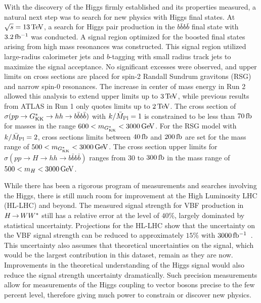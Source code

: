 With the discovery of the Higgs firmly established and its properties measured, a natural next step was to search for new physics with Higgs final states. At $\sqrt{s} = 13 \TeV$, a search for Higgs pair production in the $b\bar{b}b\bar{b}$ final state with $3.2\mbox{\,fb$^{-1}$}$ was conducted. A signal region optimized for the boosted final states arising from high mass resonances was constructed. This signal region utilized large-radius calorimeter jets and $b$-tagging with small radius track jets to maximize the signal acceptance. No significant excesses were observed, and upper limits on cross sections are placed for spin-2 Randall Sundrum gravitons (RSG) and narrow spin-0 resonances. The increase in center of mass energy in Run 2 allowed this analysis to extend upper limits up to $3 \TeV$, while previous results from ATLAS in Run 1 only quotes limits up to $2 \TeV$. The cross section of $\sigma(pp \to G^*_{\rm KK} \to hh \to b\bar{b}b\bar{b})$ with $k/\bar{M}_{\rm Pl}=1$ is constrained to be less than $70 \mbox{\,fb}$ for masses in the range $600 < m_{\Gkk} < 3000 \GeV$. For the RSG model with $k/\bar{M}_{\rm Pl}=2$, cross sections limits between $40\mbox{\,fb}$ and $200 \mbox{\,fb}$ are set for the mass range of $500 < m_{\Gkk} < 3000 \GeV$. The cross section upper limits for $\sigma(pp \to H \to hh \to b\bar{b}b\bar{b})$ ranges from $30$ to $300 \mbox{\,fb}$ in the mass range of $500 < m_{H} < 3000 \GeV$. 

While there has been a rigorous program of measurements and searches involving the Higgs, there is still much room for improvement at the High Luminosity LHC (HL-LHC) and beyond. The measured signal strength for VBF production in $H{\,{\rightarrow}\,}WW^\ast$ still has a relative error at the level of $40\%$, largely dominated by statistical uncertainty. Projections for the HL-LHC show that the uncertainty on the VBF signal strength can be reduced to approximately $15\%$ with $3000 \mbox{\,fb$^{-1}$}$~\cite{HiggsProj,ScopingDocument}. This uncertainty also assumes that theoretical uncertainties on the signal, which would be the largest contribution in this dataset, remain as they are now. Improvements in the theoretical understanding of the Higgs signal would also reduce the signal strength uncertainty dramatically. Such precision measurements allow for measurements of the Higgs coupling to vector bosons precise to the few percent level, therefore giving much power to constrain or discover new physics. 

